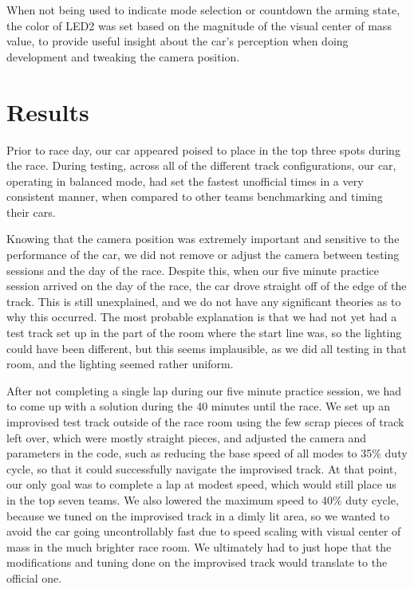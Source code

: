 \documentclass{article}
\begin{document}
When not being used to indicate mode selection or countdown the arming state, the color of LED2 was set based on the magnitude of the visual center of mass value, to provide useful insight about the car's perception when doing development and tweaking the camera position. 

\section{Results}
\label{sec:results}
Prior to race day, our car appeared poised to place in the top three spots during the race. During testing, across all of the different track configurations, our car, operating in balanced mode, had set the fastest unofficial times in a very consistent manner, when compared to other teams benchmarking and timing their cars. 


Knowing that the camera position was extremely important and sensitive to the performance of the car, we did not remove or adjust the camera between testing sessions and the day of the race. Despite this, when our five minute practice session arrived on the day of the race, the car drove straight off of the edge of the track. This is still unexplained, and we do not have any significant theories as to why this occurred. The most probable explanation is that we had not yet had a test track set up in the part of the room where the start line was, so the lighting could have been different, but this seems implausible, as we did all testing in that room, and the lighting seemed rather uniform. 

After not completing a single lap during our five minute practice session, we had to come up with a solution during the 40 minutes until the race. We set up an improvised test track outside of the race room using the few scrap pieces of track left over, which were mostly straight pieces, and adjusted the camera and parameters in the code, such as reducing the base speed of all modes to 35\% duty cycle, so that it could successfully navigate the improvised track. At that point, our only goal was to complete a lap at modest speed, which would still place us in the top seven teams. We also lowered the maximum speed to 40\% duty cycle, because we tuned on the improvised track in a dimly lit area, so we wanted to avoid the car going uncontrollably fast due to speed scaling with visual center of mass in the much brighter race room. We ultimately had to just hope that the modifications and tuning done on the improvised track would translate to the official one.
\end{document}
